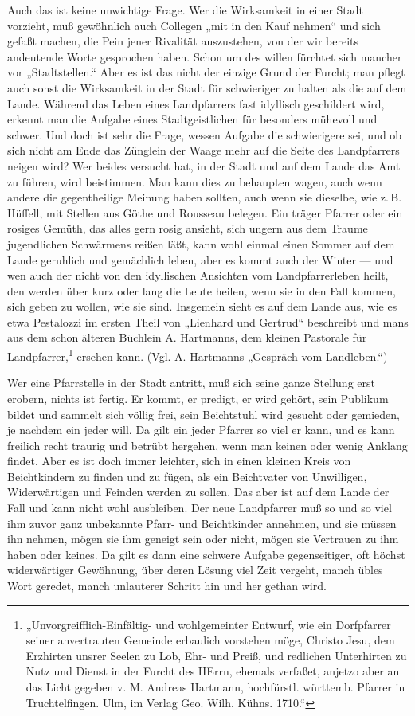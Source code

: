 Auch das ist keine unwichtige Frage. Wer die Wirksamkeit in einer Stadt vorzieht, muß gewöhnlich auch Collegen „mit in den Kauf nehmen“ und sich gefaßt machen, die Pein jener Rivalität auszustehen, von der wir bereits andeutende Worte gesprochen haben. Schon um des willen fürchtet sich mancher vor „Stadtstellen.“ Aber es ist das nicht der einzige Grund der Furcht; man pflegt auch sonst die Wirksamkeit in der Stadt für schwieriger zu halten als die auf dem Lande. Während das Leben eines Landpfarrers fast idyllisch geschildert wird, erkennt man die Aufgabe eines Stadtgeistlichen für besonders mühevoll und schwer. Und doch ist sehr die Frage, wessen Aufgabe die schwierigere sei, und ob sich nicht am Ende das Zünglein der Waage mehr auf die Seite des Landpfarrers neigen wird? Wer beides versucht hat, in der Stadt und auf dem Lande das Amt zu führen, wird beistimmen. Man kann dies zu behaupten wagen, auch wenn andere
die gegentheilige Meinung haben sollten, auch wenn sie dieselbe, wie z.\,B. Hüffell, mit Stellen aus Göthe und Rousseau belegen. Ein träger Pfarrer oder ein rosiges Gemüth, das alles gern rosig ansieht, sich ungern aus dem Traume jugendlichen Schwärmens reißen läßt, kann wohl einmal einen Sommer auf dem Lande geruhlich und gemächlich leben, aber es kommt auch der Winter — und wen auch der nicht von den idyllischen Ansichten vom Landpfarrerleben heilt, den werden über kurz oder lang die Leute heilen, wenn sie in den Fall kommen, sich geben zu wollen, wie sie sind. Insgemein sieht es auf dem Lande aus, wie es etwa Pestalozzi im ersten Theil von „Lienhard und Gertrud“ beschreibt und mans aus dem schon älteren Büchlein A. Hartmanns, dem kleinen Pastorale für Landpfarrer,\footnote{„Unvorgreifflich-Einfältig- und wohlgemeinter Entwurf, wie ein Dorfpfarrer seiner anvertrauten Gemeinde erbaulich vorstehen möge, Christo Jesu, dem Erzhirten unsrer Seelen zu Lob, Ehr- und Preiß, und redlichen Unterhirten zu Nutz und Dienst in der Furcht des HErrn, ehemals verfaßet, anjetzo aber an das Licht gegeben v. M. Andreas Hartmann, hochfürstl. württemb. Pfarrer in Truchtelfingen. Ulm, im Verlag Geo. Wilh. Kühns. 1710.“} ersehen kann. (Vgl. A. Hartmanns „Gespräch vom Landleben.“)

Wer eine Pfarrstelle in der Stadt antritt, muß sich seine ganze Stellung erst erobern, nichts ist fertig. Er kommt, er predigt, er wird gehört, sein Publikum bildet und sammelt sich völlig frei, sein Beichtstuhl wird gesucht oder gemieden, je nachdem ein jeder will. Da gilt ein jeder Pfarrer so viel er kann, und es kann freilich recht traurig und betrübt hergehen, wenn man keinen oder wenig
Anklang findet. Aber es ist doch immer leichter, sich in einen kleinen Kreis von Beichtkindern zu finden und zu fügen, als ein Beichtvater von Unwilligen, Widerwärtigen und Feinden werden zu sollen. Das aber ist auf dem Lande der Fall und kann nicht wohl ausbleiben. Der neue Landpfarrer muß so und so viel ihm zuvor ganz unbekannte Pfarr- und Beichtkinder annehmen, und sie müssen ihn nehmen, mögen sie ihm geneigt sein oder nicht, mögen sie Vertrauen zu ihm haben oder keines. Da gilt es dann eine schwere Aufgabe gegenseitiger, oft höchst widerwärtiger Gewöhnung, über deren Lösung viel Zeit vergeht, manch übles Wort geredet, manch unlauterer Schritt hin und her gethan wird.


